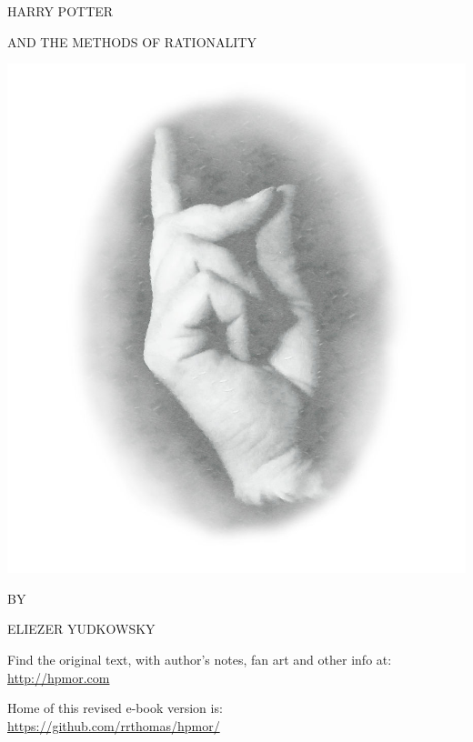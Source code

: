 
\begin{center}
\thispagestyle{empty}
{\hpfont
\Huge\MakeUppercase{Harry Potter}\vspace*{0.5cm}

\Large\MakeUppercase{and the Methods of Rationality} %

\includegraphics[scale=0.5]{images/bubble0.jpg}

\Large BY \vspace*{.25cm}

\huge \MakeUppercase{Eliezer Yudkowsky}%

\normalsize

\vspace*{1\baselineskip}
\fullvolumetitle{\volumenumber}
}

\vfill
Find the original text, with author's notes, fan art and other info at:\\
\url{http://hpmor.com}

Home of this revised e-book version is:\\
\url{https://github.com/rrthomas/hpmor/}
\end{center}

\cleartoverso

